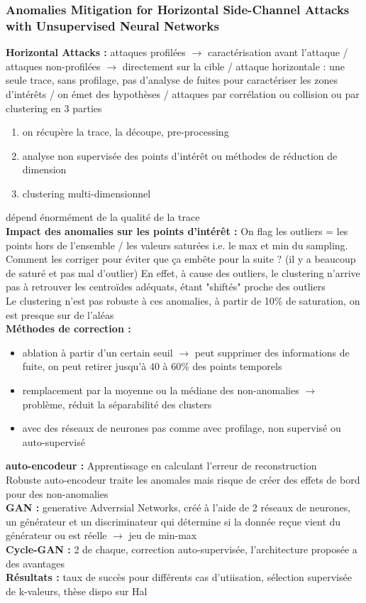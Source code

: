 \documentclass[12pt]{article}
\begin{document}
	\subsubsection{Anomalies Mitigation for Horizontal Side-Channel Attacks with Unsupervised Neural Networks}
	\textbf{Horizontal Attacks :} attaques profilées $\rightarrow$ caractérisation avant l'attaque / attaques non-profilées $\rightarrow$ directement sur la cible / attaque horizontale : une seule trace, sans profilage, pas d'analyse de fuites pour caractériser les zones d'intérêts / on émet des hypothèses / attaques par corrélation ou collision ou par clustering en 3 parties 
	\begin{enumerate}
		\item on récupère la trace, la découpe, pre-processing
		\item analyse non supervisée des points d'intérêt ou méthodes de réduction de dimension
		\item clustering multi-dimensionnel
	\end{enumerate}
	dépend énormément de la qualité de la trace \\
	\textbf{Impact des anomalies sur les points d'intérêt :} On flag les outliers = les points hors de l'ensemble / les valeurs saturées i.e. le max et min du sampling. Comment les corriger pour éviter que ça embête pour la suite ? (il y a beaucoup de saturé et pas mal d'outlier) En effet, à cause des outliers, le clustering n'arrive pas à retrouver les centroïdes adéquats, étant "shiftés" proche des outliers\\
	Le clustering n'est pas robuste à ces anomalies, à partir de 10\% de saturation, on est presque sur de l'aléas\\
	\textbf{Méthodes de correction :} \begin{itemize}
		\item ablation à partir d'un certain seuil $\rightarrow$ peut supprimer des informations de fuite, on peut retirer jusqu'à 40 à 60\% des points temporels 
		\item remplacement par la moyenne ou la médiane des non-anomalies $\rightarrow$ problème, réduit la séparabilité des clusters
		\item avec des réseaux de neurones pas comme avec profilage, non supervisé ou auto-supervisé
	\end{itemize}
	\textbf{auto-encodeur :} Apprentissage en calculant l'erreur de reconstruction\\
	Robuste auto-encodeur traite les anomales mais risque de créer des effets de bord pour des non-anomalies\\
	\textbf{GAN :} generative Adverrsial Networks, créé à l'aide de 2 réseaux de neurones, un générateur et un discriminateur qui détermine si la donnée reçue vient du générateur ou est réelle $\rightarrow$ jeu de min-max\\ 
	\textbf{Cycle-GAN :} 2 de chaque, correction auto-supervisée, l'architecture proposée a des avantages\\
	\textbf{Résultats :} taux de succès pour différents cas d'utiisation, sélection supervisée de k-valeurs, thèse dispo sur Hal
	
\end{document}
